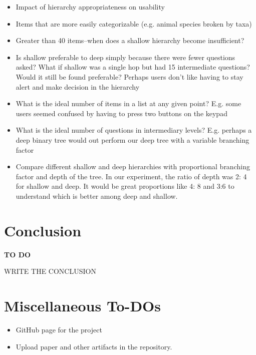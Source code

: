 \documentclass{sigchi}
\begin{document}
\begin{itemize}
\item Impact of hierarchy appropriateness on usability
\item Items that are more easily categorizable (e.g. animal species broken by taxa)
\item Greater than 40 items--when does a shallow hierarchy become insufficient?
\item Is shallow preferable to deep simply because there were fewer questions asked? What if shallow was a single hop but had 15 intermediate questions? Would it still be found preferable? Perhaps users don't like having to stay alert and make decision in the hierarchy
\item What is the ideal number of items in a list at any given point? E.g. some users seemed confused by having to press two buttons on the keypad
\item What is the ideal number of questions in intermediary levels? E.g. perhaps a deep binary tree would out perform our deep tree with a variable branching factor
\item Compare different shallow and deep hierarchies with proportional branching factor and depth of the tree. In our experiment, the ratio of depth was 2: 4 for shallow and deep. It would be great proportions like 4: 8 and 3:6 to understand which is better among deep and shallow. 
\end{itemize}

\section{Conclusion}
\textbf{TO DO}

WRITE THE CONCLUSION

\section{Miscellaneous To-DOs}
\begin{itemize}
\item GitHub page for the project
\item Upload paper and other artifacts in the repository. 
\end{itemize}





%
%
%
%
%
\balance



\end{document}
